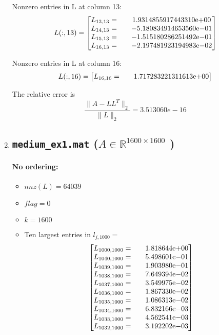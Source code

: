 \begin{enumerate}
Nonzero entries in L at column 13:
$$
L(:,13) = 
\begin{bmatrix}
L_{13,13}=  & \quad {1.9314855917443310}\mathrm{e}{+00}\\
L_{14,13}=  & \quad {-5.180834914653560}\mathrm{e}{-01}\\
L_{15,13}=  & \quad {-1.515180286251492}\mathrm{e}{-01}\\
L_{16,13}=  & \quad {-2.197481923194983}\mathrm{e}{-02}\\
\end{bmatrix}
$$

Nonzero entries in L at column 16:
$$
L(:,16) = 
\begin{bmatrix}
L_{16,16}=  & \quad {1.717283221311613}\mathrm{e}{+00}\\
\end{bmatrix}
$$


The relative error is
$$
\frac{\parallel A- LL^{T}\parallel_{2}}{\parallel L \parallel_{2}} = 3.513060e-16
$$
\newpage
\item 
\subsection*{\texttt{medium\_ex1.mat} ($A\in \mathbb{R}^{1600\times 1600}$ )}
\paragraph*{No ordering:}
\begin{itemize}
\item $nnz(L)= 64039$
\item $flag= 0$
\item $k= 1600$
\item Ten largest entries in $l_{j,1000}= $
$$
\begin{bmatrix}
L_{1000,1000}=  & \quad {1.818644}\mathrm{e}{+00}\\
L_{1040,1000}=  & \quad {5.498601}\mathrm{e}{-01}\\
L_{1039,1000}=  & \quad {1.903980}\mathrm{e}{-01}\\
L_{1038,1000}=  & \quad {7.649394}\mathrm{e}{-02}\\
L_{1037,1000}=  & \quad {3.549975}\mathrm{e}{-02}\\
L_{1036,1000}=  & \quad {1.867330}\mathrm{e}{-02}\\
L_{1035,1000}=  & \quad {1.086313}\mathrm{e}{-02}\\
L_{1034,1000}=  & \quad {6.832166}\mathrm{e}{-03}\\
L_{1033,1000}=  & \quad {4.562541}\mathrm{e}{-03}\\
L_{1032,1000}=  & \quad {3.192202}\mathrm{e}{-03}\\
\end{bmatrix}
$$
\end{itemize}

\end{enumerate}
